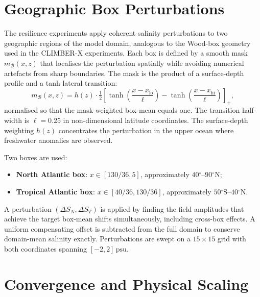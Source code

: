 \documentclass[12pt, a4paper]{article}
\newcommand{\psu}{\,\text{psu}}
\begin{document}
\section{Geographic Box Perturbations}
\label{sec:boxes}

The resilience experiments apply coherent salinity perturbations to two
geographic regions of the model domain, analogous to the Wood-box geometry
used in the CLIMBER-X experiments. Each box is defined by a smooth mask
$m_\mathcal{B}(x, z)$ that localises the perturbation spatially while avoiding
numerical artefacts from sharp boundaries. The mask is the product of a
surface-depth profile and a tanh lateral transition:
\begin{equation}
  m_\mathcal{B}(x,z) = h(z)\cdot\tfrac{1}{2}\left[
    \tanh\!\left(\frac{x - x_\mathrm{lo}}{\ell}\right)
    - \tanh\!\left(\frac{x - x_\mathrm{hi}}{\ell}\right)
  \right]_+,
\end{equation}
normalised so that the mask-weighted box-mean equals one. The transition
half-width is $\ell = 0.25$ in non-dimensional latitude coordinates. The
surface-depth weighting $h(z)$ concentrates the perturbation in the upper
ocean where freshwater anomalies are observed.

Two boxes are used:
\begin{itemize}
  \item \textbf{North Atlantic box}: $x \in [130/36, 5]$, approximately $40{^\circ}$--$90{^\circ}\text{N}$;
  \item \textbf{Tropical Atlantic box}: $x \in [40/36, 130/36]$, approximately $50{^\circ}\text{S}$--$40{^\circ}\text{N}$.
\end{itemize}
A perturbation $(\Delta S_N, \Delta S_T)$ is applied by finding the field
amplitudes that achieve the target box-mean shifts simultaneously, including
cross-box effects. A uniform compensating offset is subtracted from the full
domain to conserve domain-mean salinity exactly. Perturbations are swept on a
$15\times15$ grid with both coordinates spanning $[-2, 2]\psu{}$.

\section{Convergence and Physical Scaling}
\label{sec:scaling}
\end{document}

